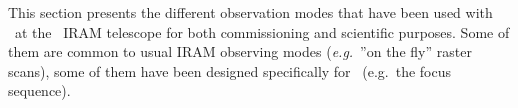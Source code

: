 

This section presents the different observation modes that have been used with
\nika\ at the \trentemetre\ IRAM telescope for both commissioning and
scientific purposes. Some of them are common
to usual IRAM observing modes (\emph{e.g.}~''on the fly'' raster scans), some of them
have been designed specifically for \nika\ (e.g.~the focus sequence).



